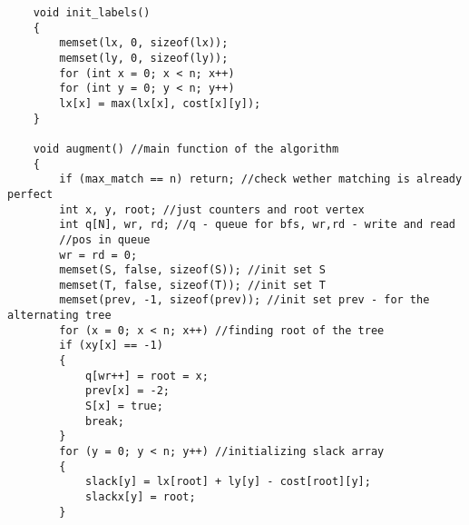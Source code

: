 \documentclass[a4paper,landscape,8pt]{extarticle}
\begin{document}
\begin{multicols}{3}
\begin{lstlisting}
    void init_labels()
    {
        memset(lx, 0, sizeof(lx));
        memset(ly, 0, sizeof(ly));
        for (int x = 0; x < n; x++)
        for (int y = 0; y < n; y++)
        lx[x] = max(lx[x], cost[x][y]);
    }

    void augment() //main function of the algorithm
    {
        if (max_match == n) return; //check wether matching is already perfect
        int x, y, root; //just counters and root vertex
        int q[N], wr, rd; //q - queue for bfs, wr,rd - write and read
        //pos in queue
        wr = rd = 0;
        memset(S, false, sizeof(S)); //init set S
        memset(T, false, sizeof(T)); //init set T
        memset(prev, -1, sizeof(prev)); //init set prev - for the alternating tree
        for (x = 0; x < n; x++) //finding root of the tree
        if (xy[x] == -1)
        {
            q[wr++] = root = x;
            prev[x] = -2;
            S[x] = true;
            break;
        }
        for (y = 0; y < n; y++) //initializing slack array
        {
            slack[y] = lx[root] + ly[y] - cost[root][y];
            slackx[y] = root;
        }


\end{lstlisting}
\end{multicols}
\end{document}
